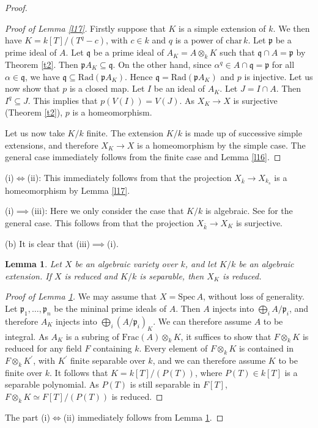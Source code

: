 \documentclass{amsart}
\newtheorem{lm}[theorem]{Lemma}
\theoremstyle{remark}\newtheorem{rmk}[theorem]{Remark}
\begin{document}
\begin{proof}
\begin{proof}[Proof of Lemma \ref{l17}]
    	Firstly suppose that $K$ is a simple extension of $k$. We then have $K=k[T]/(T^q-c)$, with $c\in k$ and $q$ is a power of $\mathrm{char}\,k$. Let $\mathfrak{p}$ be a prime ideal of $A$. Let $\mathfrak{q}$ be a prime ideal of $A_K=A\otimes_kK$ such that $\mathfrak{q}\cap A=\mathfrak{p}$ by Theorem \ref{t2}. Then $\mathfrak{p}A_K\subseteq\mathfrak{q}$. On the other hand, since $\alpha^q\in A\cap\mathfrak{q}=\mathfrak{p}$ for all $\alpha\in\mathfrak{q}$, we have $\mathfrak{q}\subseteq\mathrm{Rad}(\mathfrak{p}A_K)$. Hence $\mathfrak{q}=\mathrm{Rad}(\mathfrak{p}A_K)$ and $p$ is injective. Let us now show that $p$ is a closed map. Let $I$ be an ideal of $A_K$. Let $J=I\cap A$. Then $I^q\subseteq J$. This implies that $p(V(I))=V(J)$. As $X_K\to X$ is surjective (Theorem \ref{t2}), $p$ is a homeomorphism.
    	
    	Let us now take $K/k$ finite. The extension $K/k$ is made up of successive simple extensions, and therefore $X_K\to X$ is a homeomorphism by the simple case. The general case immediately follows from the finite case and Lemma \ref{l16}.
    \end{proof}
    (i)$\iff$(ii): This immediately follows from that the projection $X_{\bar{k}}\to X_{k_s}$ is a homeomorphism by Lemma \ref{l17}.
    
    (i)$\implies$(iii): Here we only consider the case that $K/k$ is algebraic. See \cite[\href{https://stacks.math.columbia.edu/tag/0364}{Tag 0364} Lemma 33.8.8]{stacks-project} for the general case. This follows from that the projection $X_{\bar{k}}\to X_K$ is surjective.
    
    (b) It is clear that (iii)$\implies$(i).
    \begin{lm}
    	\label{l18}
    	Let $X$ be an algebraic variety over $k$, and let $K/k$ be an algebraic extension. If $X$ is reduced and $K/k$ is separable, then $X_K$ is reduced.
    \end{lm}
    \begin{proof}[Proof of Lemma \ref{l18}]
    	We may assume that $X=\mathrm{Spec}\,A$, without loss of generality. Let $\mathfrak{p}_1,\dots,\mathfrak{p}_n$ be the mininal prime ideals of $A$. Then $A$ injects into $\bigoplus_iA/\mathfrak{p}_i$, and therefore $A_K$ injects into $\bigoplus_i(A/\mathfrak{p}_i)_K$. We can therefore assume $A$ to be integral. As $A_K$ is a subring of $\mathrm{Frac}(A)\otimes_kK$, it suffices to show that $F\otimes_kK$ is reduced for any field $F$ containing $k$. Every element of $F\otimes_kK$ is contained in $F\otimes_kK^{\prime}$, with $K^{\prime}$ finite separable over $k$, and we can therefore assume $K$ to be finite over $k$. It follows that $K=k[T]/(P(T))$, where $P(T)\in k[T]$ is a separable polynomial. As $P(T)$ is still separable in $F[T]$, $F\otimes_kK\simeq F[T]/(P(T))$ is reduced.
    \end{proof}
    The part (i)$\iff$(ii) immediately follows from Lemma \ref{l18}.
    

\end{proof}
\end{document}
